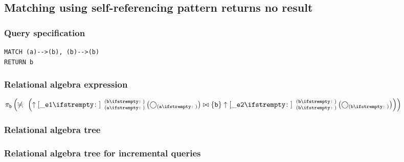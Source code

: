 \subsection{Matching using self-referencing pattern returns no result}

\subsubsection*{Query specification}

\begin{lstlisting}
MATCH (a)-->(b), (b)-->(b)
RETURN b
\end{lstlisting}

\subsubsection*{Relational algebra expression}

$\projection{\var{b}} \left(\alldifferent{} \left(\expandout{\_e1}{}{a}{b}{} \left(\getvertices{a}{}\right) \join \{\var{b}\} \expandout{\_e2}{}{b}{b}{} \left(\getvertices{b}{}\right)\right)\right)$

\subsubsection*{Relational algebra tree}


\subsubsection*{Relational algebra tree for incremental queries}

